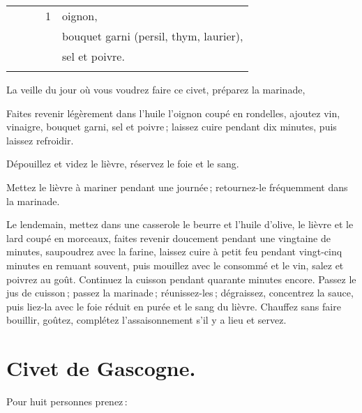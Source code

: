 \begin{tabular}{@{}lrrrp{16em}}
\hspace{2em}  &     &         &  1 & oignon,                                                              \\
\hspace{2em}  &     &         &    & bouquet garni (persil, thym, laurier),                               \\
\hspace{2em}  &     &         &    & sel et poivre.                                                       \\
\hspace{2em}  &     &         &    &                                                                      \\
\end{tabular}
\normalsize

La veille du jour où vous voudrez faire ce civet, préparez la marinade,

Faites revenir légèrement dans l'huile l'oignon coupé en rondelles, ajoutez
vin, vinaigre, bouquet garni, sel et poivre ; laissez cuire pendant dix
minutes, puis laissez refroidir.

Dépouillez et videz le lièvre, réservez le foie et le sang.

Mettez le lièvre à mariner pendant une journée ; retournez-le fréquemment dans
la marinade.

Le lendemain, mettez dans une casserole le beurre et l'huile d'olive, le lièvre
et le lard coupé en morceaux, faites revenir doucement pendant une vingtaine de
minutes, saupoudrez avec la farine, laissez cuire à petit feu pendant
vingt-cinq minutes en remuant souvent, puis mouillez avec le consommé et le
vin, salez et poivrez au goût. Continuez la cuisson pendant quarante minutes
encore. Passez le jus de cuisson ; passez la marinade ; réunissez-les ;
dégraissez, concentrez la sauce, puis liez-la avec le foie réduit en purée et
le sang du lièvre. Chauffez sans faire bouillir, goûtez, complétez
l'assaisonnement s'il y a lieu et servez.

\section*{\centering Civet de Gascogne.}
{}

Pour huit personnes prenez :

